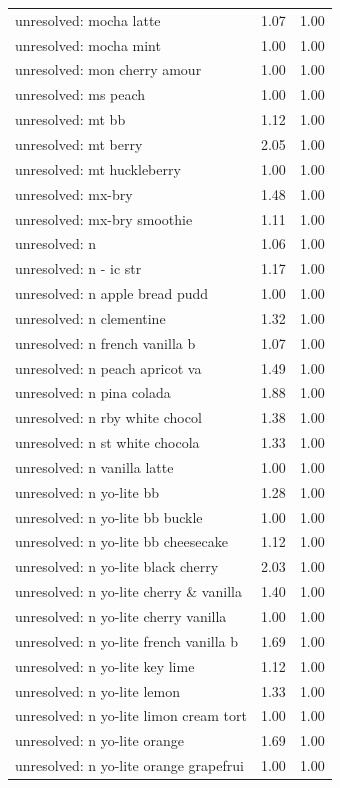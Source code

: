 \begin{table}
\begin{tabular}{lrr}
unresolved: mocha latte & 1.07 & 1.00 \\
unresolved: mocha mint & 1.00 & 1.00 \\
unresolved: mon cherry amour & 1.00 & 1.00 \\
unresolved: ms peach & 1.00 & 1.00 \\
unresolved: mt bb & 1.12 & 1.00 \\
unresolved: mt berry & 2.05 & 1.00 \\
unresolved: mt huckleberry & 1.00 & 1.00 \\
unresolved: mx-bry & 1.48 & 1.00 \\
unresolved: mx-bry smoothie & 1.11 & 1.00 \\
unresolved: n & 1.06 & 1.00 \\
unresolved: n - ic str & 1.17 & 1.00 \\
unresolved: n apple bread pudd & 1.00 & 1.00 \\
unresolved: n clementine & 1.32 & 1.00 \\
unresolved: n french vanilla b & 1.07 & 1.00 \\
unresolved: n peach apricot va & 1.49 & 1.00 \\
unresolved: n pina colada & 1.88 & 1.00 \\
unresolved: n rby white chocol & 1.38 & 1.00 \\
unresolved: n st white chocola & 1.33 & 1.00 \\
unresolved: n vanilla latte & 1.00 & 1.00 \\
unresolved: n yo-lite bb & 1.28 & 1.00 \\
unresolved: n yo-lite bb buckle & 1.00 & 1.00 \\
unresolved: n yo-lite bb cheesecake & 1.12 & 1.00 \\
unresolved: n yo-lite black cherry & 2.03 & 1.00 \\
unresolved: n yo-lite cherry \& vanilla & 1.40 & 1.00 \\
unresolved: n yo-lite cherry vanilla & 1.00 & 1.00 \\
unresolved: n yo-lite french vanilla b & 1.69 & 1.00 \\
unresolved: n yo-lite key lime & 1.12 & 1.00 \\
unresolved: n yo-lite lemon & 1.33 & 1.00 \\
unresolved: n yo-lite limon cream tort & 1.00 & 1.00 \\
unresolved: n yo-lite orange & 1.69 & 1.00 \\
unresolved: n yo-lite orange grapefrui & 1.00 & 1.00 \\

\end{tabular}
\end{table}

